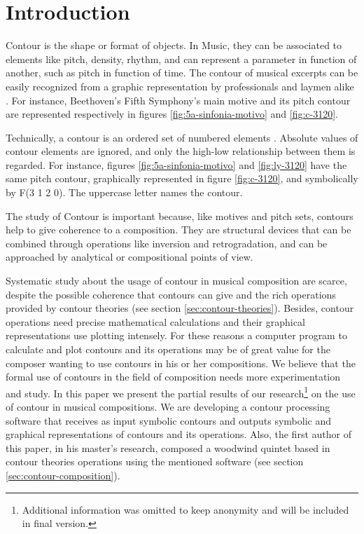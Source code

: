 

\section{Introduction}
\label{sec:introduction}
Contour is the shape or format of objects. In Music, they can be
associated to elements like pitch, density, rhythm, and can represent
a parameter in function of another, such as pitch in function of time.
The contour of musical excerpts can be easily recognized from a
graphic representation by professionals and laymen alike
\cite{marvin88:generalized}. For instance, Beethoven's Fifth
Symphony's main motive and its pitch contour are represented
respectively in figures \ref{fig:5a-sinfonia-motivo} and
\ref{fig:c-3120}.

Technically, a contour is an ordered set of numbered elements
\cite{morris93:directions}. Absolute values of contour elements are
ignored, and only the high-low relationship between them is
regarded. For instance, figures \ref{fig:5a-sinfonia-motivo} and
\ref{fig:ly-3120} have the same pitch contour, graphically represented
in figure \ref{fig:c-3120}, and symbolically by F(3 1 2 0). The
uppercase letter names the contour.

The study of Contour is important because, like motives and pitch
sets, contours help to give coherence to a composition. They are
structural devices that can be combined through operations like
inversion and retrogradation, and can be approached by analytical or
compositional points of view.

Systematic study about the usage of contour in musical composition are
scarce, despite the possible coherence that contours can give and the
rich operations provided by contour theories (see section
\ref{sec:contour-theories}). Besides, contour operations need precise
mathematical calculations and their graphical representations use
plotting intensely. For these reasons a computer program to calculate
and plot contours and its operations may be of great value for the
composer wanting to use contours in his or her compositions. We
believe that the formal use of contours in the field of composition
needs more experimentation and study. In this paper we present the
partial results of our research\footnote{Additional information was
  omitted to keep anonymity and will be included in final version.} on
the use of contour in musical compositions. We are developing a
contour processing software that receives as input symbolic contours
and outputs symbolic and graphical representations of contours and its
operations. Also, the first author of this paper, in his master's
research, composed a woodwind quintet based in contour theories
operations using the mentioned software (see section
\ref{sec:contour-composition}).

